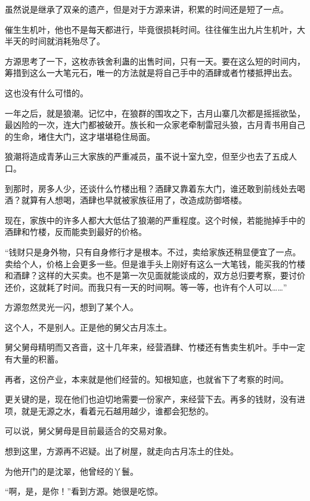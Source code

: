 
\begin{this_body}

虽然说是继承了双亲的遗产，但是对于方源来讲，积累的时间还是短了一点。

催生生机叶，他也不是每天都进行，毕竟很损耗时间。往往催生出九片生机叶，大半天的时间就消耗殆尽了。

方源思考了一下，这枚赤铁舍利蛊的出售时间，只有一天。要在这么短的时间内，筹措到这么一大笔元石，唯一的方法就是将自己手中的酒肆或者竹楼抵押出去。

这也没有什么可惜的。

一年之后，就是狼潮。记忆中，在狼群的围攻之下，古月山寨几次都是摇摇欲坠，最凶险的一次，连大门都被破开。族长和一众家老牵制雷冠头狼，古月青书用自己的生命，堵住大门，这才堪堪稳住局面。

狼潮将造成青茅山三大家族的严重减员，虽不说十室九空，但至少也去了五成人口。

到那时，房多人少，还谈什么竹楼出租？酒肆又靠着东大门，谁还敢到前线处去喝酒？就算有人想喝，酒肆也早就被家族征用了，改造成防御塔楼。

现在，家族中的许多人都大大低估了狼潮的严重程度。这个时候，若能抛掉手中的酒肆和竹楼，反而能卖到最好的价格。

“钱财只是身外物，只有自身修行才是根本。不过，卖给家族还稍显便宜了一点。卖给个人，价格上会更多一些。但是谁手头上刚好有这么一大笔钱，能买我的竹楼和酒肆？这样的大买卖。也不是第一次见面就能谈成的，双方总归要考察，要讨价还价，这就耗了时间。而我只有一天的时间啊。等一等，也许有个人可以……”

方源忽然灵光一闪，想到了某个人。

这个人，不是别人。正是他的舅父古月冻土。

舅父舅母精明而又吝啬，这十几年来，经营酒肆、竹楼还有售卖生机叶。手中一定有大量的积蓄。

再者，这份产业，本来就是他们经营的。知根知底，也就省下了考察的时间。

更关键的是，现在他们也迫切地需要一份家产，来经营下去。再多的钱财，没有进项，就是无源之水，看着元石越用越少，谁都会犯愁的。

可以说，舅父舅母是目前最适合的交易对象。

想到这里，方源再不迟疑。出了树屋，就走向古月冻土的住处。

为他开门的是沈翠，他曾经的丫鬟。

“啊，是，是你！”看到方源。她很是吃惊。


\end{this_body}
